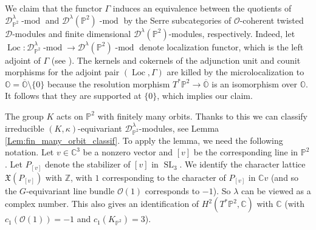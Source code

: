 \documentclass[12pt]{amsart}
\newcommand{\C}{\mathbb{C}}
\newcommand{\Orb}{\mathbb{O}}
\newcommand{\Z}{\mathbb{Z}}
\newcommand{\kf}{\mathfrak{k}}
\newcommand{\Pb}{\mathbb{P}}
\newtheorem{Lem}[Thm]{Lemma}
\theoremstyle{definition}
\numberwithin{equation}{section}
\begin{document}
We claim that
the functor $\Gamma$ induces an equivalence between the
quotients of $\mathscr{D}^\lambda_{\Pb^2}\operatorname{-mod}$ and $\mathscr{D}^\lambda(\Pb^2)\operatorname{-mod}$
by the Serre subcategories of $\mathcal{O}$-coherent twisted $\mathscr{D}$-modules and
finite dimensional $\mathscr{D}^\lambda(\Pb^2)$-modules, respectively. Indeed, let $\operatorname{Loc}: \mathscr{D}^\lambda_{\Pb^2}\operatorname{-mod} \to \mathscr{D}^\lambda(\Pb^2)\operatorname{-mod}$
denote localization functor, which is the left adjoint of $\Gamma$ (see \cite[Section 3.3]{BB}). The kernels and cokernels of the adjunction unit and 
counit morphisms for the adjoint pair $(\operatorname{Loc},\Gamma)$ are killed by the microlocalization
to $\Orb=\overline{\Orb}\setminus \{0\}$ because the resolution morphism $T^*\Pb^2\rightarrow \overline{\Orb}$
is an isomorphism over $\Orb$. It follows that they are supported at $\{0\}$, which implies our claim.  

The group $K$ acts on $\Pb^2$ with finitely many orbits. Thanks to this we can classify
irreducible $(K,\kappa)$-equivariant $\mathscr{D}^\lambda_{\Pb^2}$-modules, see Lemma \ref{Lem:fin_many_orbit_classif}. To apply the lemma, we need the following notation.
Let $v\in \C^3$ be a nonzero vector and $[v]$ be the corresponding line
in $\Pb^2$. Let $P_{[v]}$ denote the stabilizer of $[v]$ in $\operatorname{SL}_3$. We identify the character
lattice $\mathfrak{X}(P_{[v]})$ with $\Z$, with $1$ corresponding to the character of
$P_{[v]}$ in $\C v$ (and so the $G$-equivariant line bundle $\mathcal{O}(1)$ corresponds to $-1$). So $\lambda$ can be viewed as 
a complex number. This also gives an identification of 
$H^2(T^*\mathbb{P}^2,\C)$ with $\C$ (with $c_1(\mathcal{O}(1))=-1$ and $c_1(K_{\mathbb{P}^2})=3$).

\end{document}
